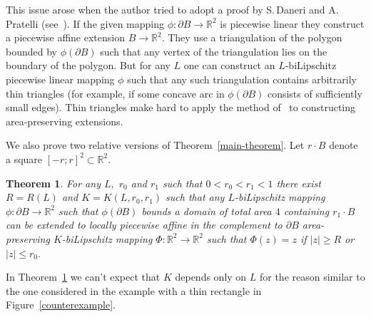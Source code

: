 \documentclass[12pt]{article}
\newtheorem{theo}[prop]{Theorem}
\theoremstyle{definition}
\begin{document}
This issue arose when the author tried to adopt a proof by S.\,Daneri and A.\,Pratelli (see~\cite{DanPrat}). If the given mapping $\phi:\partial B\to\mathbb R^2$ is piecewise linear they construct a piecewise affine extension $B\to\mathbb R^2.$ They use a triangulation of the polygon bounded by $\phi(\partial B)$ such that any vertex of the triangulation lies on the boundary of the polygon. But for any $L$ one can construct an $L$-biLipschitz piecewise linear mapping $\phi$ such that any such triangulation contains arbitrarily thin triangles (for example, if some concave arc in $\phi(\partial B)$ consists of sufficiently small edges). Thin triangles make hard to apply the method of~\cite{DanPrat} to constructing area-preserving extensions.


We also prove two relative versions of Theorem~\ref{main-theorem}. Let $r\cdot B$ denote a square $[-r;r]^2\subset\mathbb R^2.$

\begin{theo}
\label{annulus-version}
For any $L,$ $r_0$ and $r_1$ such that $0<r_0<r_1<1$ there exist $R = R(L)$ and $K = K(L, r_0, r_1)$ such that any $L$-biLipschitz mapping $\phi:\partial B\to\mathbb R^2$ such that $\phi(\partial B)$ bounds a domain of total area $4$ containing $r_1\cdot B$
can be extended to locally piecewise affine in the complement to $\partial B$ area-preserving  $K$-biLipschitz mapping $\Phi:\mathbb R^2\to\mathbb R^2$ such that $\Phi(z) = z$ if $|z|\ge R$ or $|z|\le r_0.$ 
\end{theo}

In Theorem~\ref{annulus-version} we can't expect that $K$ depends only on $L$ for the reason similar to the one considered in the example with a thin rectangle in Figure~\ref{counterexample}. 
\end{document}
